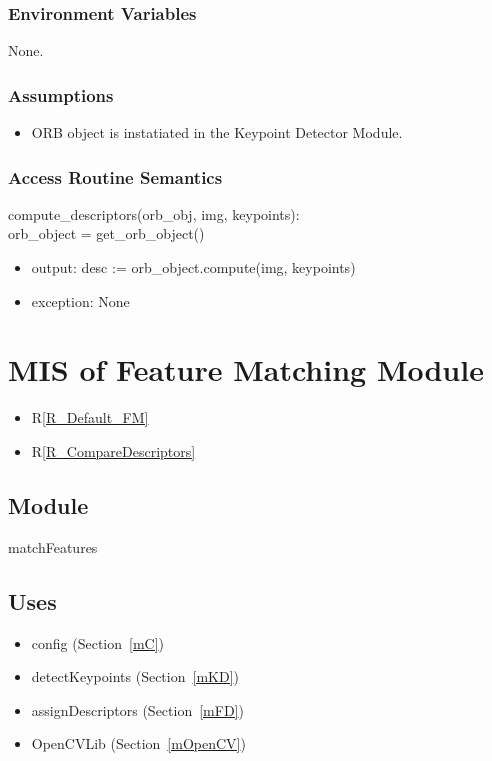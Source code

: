 \documentclass[12pt, titlepage]{article}
\begin{document}
\subsubsection{Environment Variables}
None.

\subsubsection{Assumptions}
\begin{itemize}
\item ORB object is instatiated in the Keypoint Detector Module.
\end{itemize}


\subsubsection{Access Routine Semantics}

\noindent compute\_descriptors(orb\_obj, img, keypoints):\\
orb\_object = get\_orb\_object()
\begin{itemize}
\item output: desc := orb\_object.compute(img, keypoints)
\item exception: None 
\end{itemize}




\section{MIS of Feature Matching Module} \label{mFM}
\begin{itemize}
  \item R\ref{R_Default_FM}
  \item R\ref{R_CompareDescriptors}
\end{itemize}
\subsection{Module}

matchFeatures

\subsection{Uses}
\begin{itemize}
  \item config (Section~\ref{mC})
  \item detectKeypoints (Section~\ref{mKD})
  \item assignDescriptors (Section~\ref{mFD})
  \item OpenCVLib (Section~\ref{mOpenCV})
\end{itemize}
\end{document}
